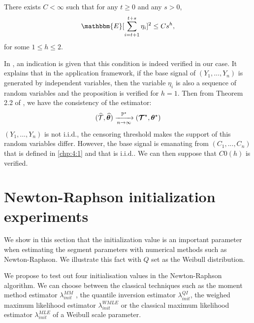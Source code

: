 \begin{appendices}
\begin{proposition}
     There exists $C < \infty$ such that for any $t\geq 0$ and any $s > 0$,
     \begin{equation}\label{app:C0}
     \mathbbm{E}[\sum_{i=t+1}^{t+s}\eta_i]^2\leq Cs^h,    
     \end{equation}
     for some $1\leq h\leq 2$.
\end{proposition}

In \cite{Lavielle1997}, an indication is given that this condition is indeed verified in our case. It explains that in the application framework, if the base signal of $(Y_1,...,Y_n)$ is generated by independent variables, then the variable $\eta_i$ is also a sequence of random variables and the proposition is verified for $h = 1$. Then from Theorem 2.2 of \cite{Lavielle1997}, we have the consistency of the estimator: 
$$ (\widehat{{\mathcal T}}, \widehat{\bm \theta}) \xrightarrow[n\rightarrow \infty]{{\mathbb P}^{\star}}   (\bm{{\mathcal T}}^{\star}, \bm \theta^{\star})$$
$(Y_1,...,Y_n)$ is not i.i.d., the censoring threshold makes the support of this random variables differ. However, the base signal is emanating from $(C_1,...,C_n)$ that is defined in \ref{chp:4:1} and that is i.i.d.. We can then suppose that $C0(h)$ is verified.  

\section{Newton-Raphson initialization experiments}\label{app:chap4:2}

We show in this section that the initialization value is an important parameter when estimating the segment parameters with numerical methods such as Newton-Raphson. We illustrate this fact with $Q$ set as the Weibull distribution.

We propose to test out four initialisation values in the Newton-Raphson algorithm. We can choose between the classical techniques such as the moment method estimator $\lambda_{init}^{MM}$ \cite{Johnson1994}, the quantile inversion estimator $\lambda_{init}^{QI}$, the weighed maximum likelihood estimator $\lambda_{init}^{WMLE}$ \cite{sadani2019new} or the classical maximum likelihood estimator $\lambda_{init}^{MLE}$ of a Weibull scale parameter. 


\end{appendices}
